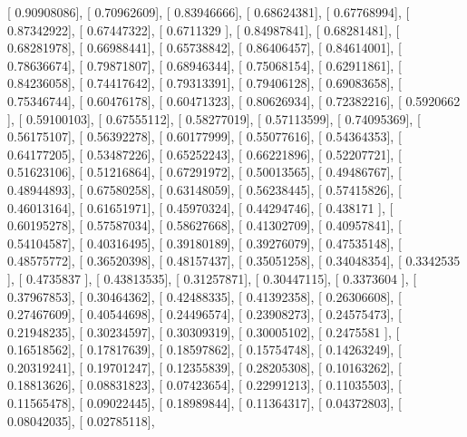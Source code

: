\documentclass{article}
\begin{document}
       [ 0.90908086],
       [ 0.70962609],
       [ 0.83946666],
       [ 0.68624381],
       [ 0.67768994],
       [ 0.87342922],
       [ 0.67447322],
       [ 0.6711329 ],
       [ 0.84987841],
       [ 0.68281481],
       [ 0.68281978],
       [ 0.66988441],
       [ 0.65738842],
       [ 0.86406457],
       [ 0.84614001],
       [ 0.78636674],
       [ 0.79871807],
       [ 0.68946344],
       [ 0.75068154],
       [ 0.62911861],
       [ 0.84236058],
       [ 0.74417642],
       [ 0.79313391],
       [ 0.79406128],
       [ 0.69083658],
       [ 0.75346744],
       [ 0.60476178],
       [ 0.60471323],
       [ 0.80626934],
       [ 0.72382216],
       [ 0.5920662 ],
       [ 0.59100103],
       [ 0.67555112],
       [ 0.58277019],
       [ 0.57113599],
       [ 0.74095369],
       [ 0.56175107],
       [ 0.56392278],
       [ 0.60177999],
       [ 0.55077616],
       [ 0.54364353],
       [ 0.64177205],
       [ 0.53487226],
       [ 0.65252243],
       [ 0.66221896],
       [ 0.52207721],
       [ 0.51623106],
       [ 0.51216864],
       [ 0.67291972],
       [ 0.50013565],
       [ 0.49486767],
       [ 0.48944893],
       [ 0.67580258],
       [ 0.63148059],
       [ 0.56238445],
       [ 0.57415826],
       [ 0.46013164],
       [ 0.61651971],
       [ 0.45970324],
       [ 0.44294746],
       [ 0.438171  ],
       [ 0.60195278],
       [ 0.57587034],
       [ 0.58627668],
       [ 0.41302709],
       [ 0.40957841],
       [ 0.54104587],
       [ 0.40316495],
       [ 0.39180189],
       [ 0.39276079],
       [ 0.47535148],
       [ 0.48575772],
       [ 0.36520398],
       [ 0.48157437],
       [ 0.35051258],
       [ 0.34048354],
       [ 0.3342535 ],
       [ 0.4735837 ],
       [ 0.43813535],
       [ 0.31257871],
       [ 0.30447115],
       [ 0.3373604 ],
       [ 0.37967853],
       [ 0.30464362],
       [ 0.42488335],
       [ 0.41392358],
       [ 0.26306608],
       [ 0.27467609],
       [ 0.40544698],
       [ 0.24496574],
       [ 0.23908273],
       [ 0.24575473],
       [ 0.21948235],
       [ 0.30234597],
       [ 0.30309319],
       [ 0.30005102],
       [ 0.2475581 ],
       [ 0.16518562],
       [ 0.17817639],
       [ 0.18597862],
       [ 0.15754748],
       [ 0.14263249],
       [ 0.20319241],
       [ 0.19701247],
       [ 0.12355839],
       [ 0.28205308],
       [ 0.10163262],
       [ 0.18813626],
       [ 0.08831823],
       [ 0.07423654],
       [ 0.22991213],
       [ 0.11035503],
       [ 0.11565478],
       [ 0.09022445],
       [ 0.18989844],
       [ 0.11364317],
       [ 0.04372803],
       [ 0.08042035],
       [ 0.02785118],
\end{document}
